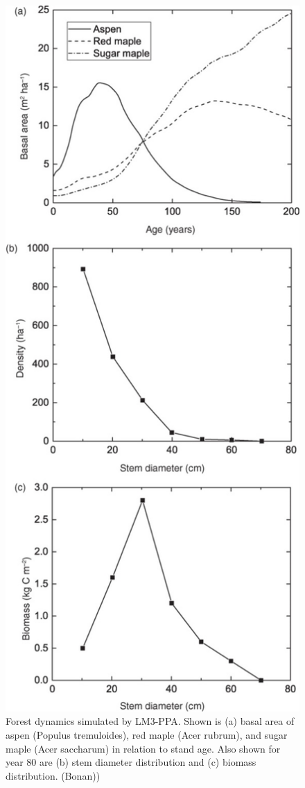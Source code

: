 \documentclass[12pt,oneside]{book}
\begin{document}
\begin{figure}

{\centering \includegraphics[width=0.8\linewidth]{figures/chap6/f633_LM3_ppa_succession} 

}

\caption{Forest dynamics simulated by LM3-PPA. Shown is (a) basal area of aspen (Populus tremuloides), red maple (Acer rubrum), and sugar maple (Acer saccharum) in relation to stand age. Also shown for year 80 are (b) stem diameter distribution and (c) biomass distribution. (Bonan))}\label{fig:f633}
\end{figure}
\end{document}
